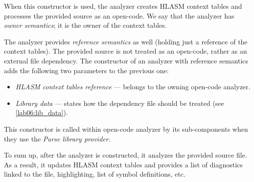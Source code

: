 When this constructor is used, the analyzer creates HLASM context tables and processes the provided source as an open-code. We say that the analyzer has \emph{owner semantics}; it is the owner of the context tables. 
 
The analyzer provides \emph{reference semantics} as well (holding just a reference of the context tables). The provided source is not treated as an open-code, rather as an external file dependency. The constructor of an analyzer with reference semantics adds the following two parameters to the previous one:
\begin{itemize}
	\item \emph{HLASM context tables reference} --- belongs to the owning open-code analyzer.
	\item \emph{Library data} --- states how the dependency file should be treated (see \cref{lab06:lib_data}).
\end{itemize}

This constructor is called within open-code analyzer by its sub-components when they use the \emph{Parse library provider}.

\vspace{0.5cm}

To sum up, after the analyzer is constructed, it analyzes the provided source file. As a result, it updates HLASM context tables and provides a list of diagnostics linked to the file, highlighting, list of symbol definitions, etc.
